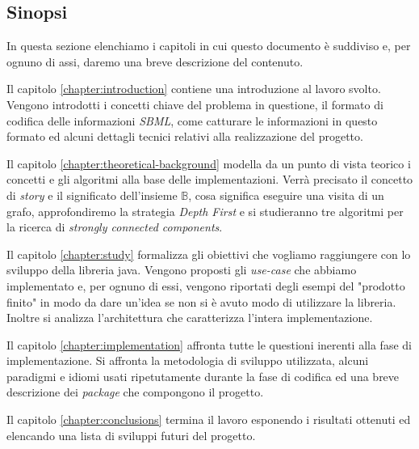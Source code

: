 \subsection{Sinopsi}
In questa sezione elenchiamo i capitoli in cui questo documento \`e
suddiviso e, per ognuno di assi, daremo una breve descrizione del
contenuto.

Il capitolo \ref{chapter:introduction} contiene una introduzione al
lavoro svolto. Vengono introdotti i concetti chiave del problema in
questione, il formato di codifica delle informazioni \emph{SBML}, come
catturare le informazioni in questo formato ed alcuni dettagli tecnici
relativi alla realizzazione del progetto.

Il capitolo \ref{chapter:theoretical-background} modella da un punto
di vista teorico i concetti e gli algoritmi alla base delle
implementazioni. Verr\`a precisato il concetto di \emph{story} e il
significato dell'insieme $\mathbb{B}$, cosa significa eseguire una
visita di un grafo, approfondiremo la strategia \emph{Depth First} e
si studieranno tre algoritmi per la ricerca di \emph{strongly
  connected components}.

Il capitolo \ref{chapter:study} formalizza gli obiettivi che vogliamo
raggiungere con lo sviluppo della libreria java. Vengono proposti gli
\emph{use-case} che abbiamo implementato e, per ognuno di essi,
vengono riportati degli esempi del "prodotto finito" in modo da dare
un'idea se non si \`e avuto modo di utilizzare la libreria. Inoltre si
analizza l'architettura che caratterizza l'intera implementazione.

Il capitolo \ref{chapter:implementation} affronta tutte le questioni
inerenti alla fase di implementazione. Si affronta la metodologia di
sviluppo utilizzata, alcuni paradigmi e idiomi usati ripetutamente
durante la fase di codifica ed una breve descrizione dei
\emph{package} che compongono il progetto.

Il capitolo \ref{chapter:conclusions} termina il lavoro esponendo i
risultati ottenuti ed elencando una lista di sviluppi futuri del
progetto.

